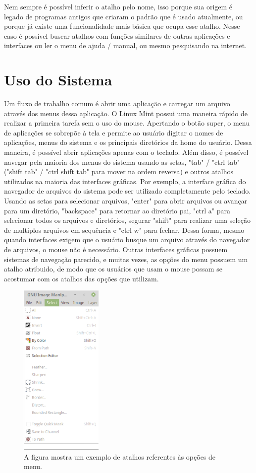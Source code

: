 \documentclass[oneside, 11 pt]{article}
\begin{document}
	Nem sempre é possível inferir o atalho pelo nome, isso porque sua origem é legado de programas antigos que criaram o padrão que é usado atualmente, ou porque já existe uma funcionalidade mais básica que ocupa esse atalho. Nesse caso é possível buscar atalhos com funções similares de outras aplicações e interfaces ou ler o menu de ajuda / manual, ou mesmo pesquisando na internet.
	
	\section{Uso do Sistema}
	Um fluxo de trabalho comum é abrir uma aplicação e carregar um arquivo através dos menus dessa aplicação. O Linux Mint possui uma maneira rápido de realizar a primeira tarefa sem o uso do mouse. Apertando o botão super, o menu de aplicações se sobrepõe à tela e permite ao usuário digitar o nomes de aplicações, menus do sistema e os principais diretórios da home do usuário. Dessa maneira, é possível abrir aplicações apenas com o teclado. Além disso, é possível navegar pela maioria dos menus do sistema usando as setas, "tab" / "ctrl tab" ("shift tab" / "ctrl shift tab" para mover na ordem reversa) e outros atalhos utilizados na maioria das interfaces gráficas. Por exemplo, a interface gráfica do navegador de arquivos do sistema pode ser utilizado completamente pelo teclado. Usando as setas para selecionar arquivos, "enter" para abrir arquivos ou avançar para um diretório, "backspace" para retornar ao diretório pai, "ctrl a" para selecionar todos os arquivos e diretórios, segurar "shift" para realizar uma seleção de multiplos arquivos em sequência e "ctrl w" para fechar. Dessa forma, mesmo quando interfaces exigem que o usuário busque um arquivo através do navegador de arquivos, o mouse não é necessário. Outras interfaces gráficas possuem sistemas de navegação parecido, e muitas vezes, as opções do menu possuem um atalho atribuido, de modo que os usuários que usam o mouse possam se acostumar com os atalhos das opções que utilizam.
	\begin{figure}[h]
		\centering
		\includegraphics[width=4.0cm]{shotc.png}
		\caption{A figura mostra um exemplo de atalhos referentes às opções de menu.}
		\label{fig:shortc}
	\end{figure}
	
\end{document}
